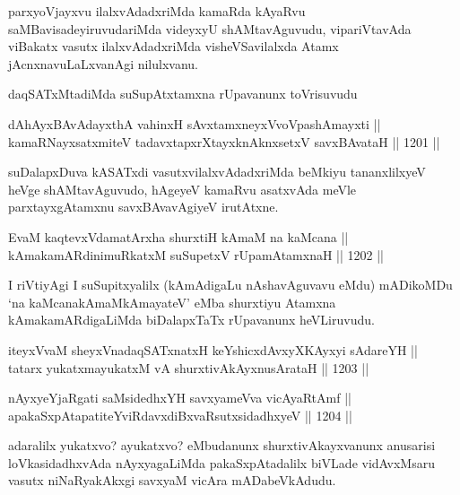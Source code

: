 \begin{artha}
parxyoVjayxvu ilalxvAdadxriMda kamaRda kAyaRvu saMBavisadeyiruvudariMda videyxyU shAMtavAguvudu, vipariVtavAda viBakatx vasutx ilalxvAdadxriMda visheVSavilalxda Atamx jAcnxnavuLaLxvanAgi nilulxvanu.
\end{artha}

\begin{artha}
daqSATxMtadiMda suSupAtxtamxna rUpavanunx toVrisuvudu
\end{artha}

\begin{shl}
dAhAyxBAvAdayxthA vahinxH sAvxtamxneyxVvoVpashAmayxti ||  \\
kamaRNayxsatxmiteV tadavxtapxrXtayxknAknxsetxV savxBAvataH ||  1201 ||  
\end{shl}

\begin{artha}
suDalapxDuva kASATxdi vasutxvilalxvAdadxriMda beMkiyu tananxlilxyeV heVge shAMtavAguvudo, hAgeyeV kamaRvu asatxvAda meVle parxtayxgAtamxnu savxBAvavAgiyeV irutAtxne.
\end{artha}

\begin{shl}
EvaM kaqtevxVdamatArx\s \s ha shurxtiH kAmaM na kaMcana || \\
kAmakamARdinimuRkatxM suSupetxV rUpamAtamxnaH ||  1202 ||  
\end{shl}

\begin{artha}
I riVtiyAgi I suSupitxyalilx (kAmAdigaLu nAshavAguvavu eMdu) mADikoMDu `na kaMcanakAmaMkAmayateV' eMba shurxtiyu Atamxna kAmakamARdigaLiMda biDalapxTaTx rUpavanunx heVLiruvudu.
\end{artha}


\begin{shl}
iteyxVvaM sheyxVnadaqSATxnatxH keYshicxdAvxyXKAyxyi sAdareYH || \\
tatarx yukatxmayukatxM vA shurxtivAkAyxnusArataH ||  1203 ||  
\end{shl}

\begin{shl}
nAyxyeYjaRgati saMsidedhxYH savxyameVva vicAyaRtAmf || \\
apakaSxpAtapatiteYviRdavxdiBxvaRsutxsidadhxyeV ||  1204 ||  
\end{shl}

\begin{artha}
adaralilx yukatxvo? ayukatxvo? eMbudanunx shurxtivAkayxvanunx anusarisi loVkasidadhxvAda nAyxyagaLiMda pakaSxpAtadalilx biVLade vidAvxMsaru vasutx niNaRyakAkxgi savxyaM vicAra mADabeVkAdudu.
\end{artha}

